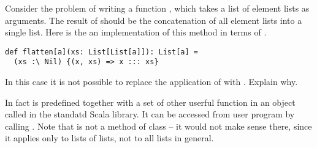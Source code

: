\begin{exercise} Consider the problem of writing a function ,
which takes a list of element lists as arguments. The result of
 should be the concatenation of all element lists into a
single list. Here is the an implementation of this method in terms of 
\code{:\\}.
\begin{lstlisting}
def flatten[a](xs: List[List[a]]): List[a] = 
  (xs :\ Nil) {(x, xs) => x ::: xs}
\end{lstlisting} 
In this case it is not possible to replace the application of
\code{:\\} with \code{/:}. Explain why.

In fact  is predefined together with a set of other
userful function in an object called  in the standatd Scala
library. It can be accessed from user program by calling
. Note that  is not a method of class
 -- it would not make sense there, since it applies only
to lists of lists, not to all lists in general.
\end{exercise}

